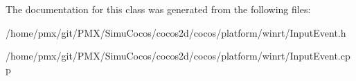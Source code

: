 The documentation for this class was generated from the following files\+:\begin{DoxyCompactItemize}
\item 
/home/pmx/git/\+P\+M\+X/\+Simu\+Cocos/cocos2d/cocos/platform/winrt/Input\+Event.\+h\item 
/home/pmx/git/\+P\+M\+X/\+Simu\+Cocos/cocos2d/cocos/platform/winrt/Input\+Event.\+cpp\end{DoxyCompactItemize}

